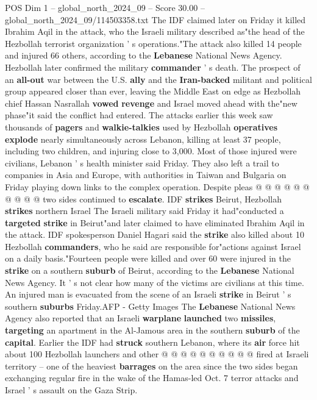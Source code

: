 \begin{textsample}{POS Dim 1 – global\_north\_2024\_09 – Score 30.00 – global\_north\_2024\_09/114503358.txt}  \label{ex:f1_pos_094}
The IDF claimed later on Friday it killed Ibrahim Aqil in the attack, who the Israeli military described as"the head of the Hezbollah terrorist organization ' s operations."The attack also killed 14 people and injured 66 others, according to the \textbf{Lebanese} National News Agency.
Hezbollah later confirmed the military \textbf{commander} ' s death.
The prospect of an \textbf{all-out} war between the U.S. \textbf{ally} and the \textbf{Iran-backed} militant and political group appeared closer than ever, leaving the Middle East on edge as Hezbollah chief Hassan Nasrallah \textbf{vowed} \textbf{revenge} and Israel moved ahead with the"new phase"it said the conflict had entered.
The attacks earlier this week saw thousands of \textbf{pagers} and \textbf{walkie-talkies} used by Hezbollah \textbf{operatives} \textbf{explode} nearly simultaneously across Lebanon, killing at least 37 people, including two children, and injuring close to 3,000.
Most of those injured were civilians, Lebanon ' s health minister said Friday.
They also left a trail to companies in Asia and Europe, with authorities in Taiwan and Bulgaria on Friday playing down links to the complex operation.
Despite pleas @ @ @ @ @ @ @ @ @ @ two sides continued to \textbf{escalate}.
IDF \textbf{strikes} Beirut, Hezbollah \textbf{strikes} northern Israel The Israeli military said Friday it had"conducted a \textbf{targeted} \textbf{strike} in Beirut"and later claimed to have eliminated Ibrahim Aqil in the attack.
IDF spokesperson Daniel Hagari said the \textbf{strike} also killed about 10 Hezbollah \textbf{commanders}, who he said are responsible for"actions against Israel on a daily basis."Fourteen people were killed and over 60 were injured in the \textbf{strike} on a southern \textbf{suburb} of Beirut, according to the \textbf{Lebanese} National News Agency.
It ' s not clear how many of the victims are civilians at this time.
An injured man is evacuated from the scene of an Israeli \textbf{strike} in Beirut ' s southern \textbf{suburbs} Friday.AFP - Getty Images The \textbf{Lebanese} National News Agency also reported that an Israeli \textbf{warplane} \textbf{launched} two \textbf{missiles}, \textbf{targeting} an apartment in the Al-Jamous area in the southern \textbf{suburb} of the \textbf{capital}.
Earlier the IDF had \textbf{struck} southern Lebanon, where its \textbf{air} force hit about 100 Hezbollah launchers and other @ @ @ @ @ @ @ @ @ @ fired at Israeli territory -- one of the heaviest \textbf{barrages} on the area since the two sides began exchanging regular fire in the wake of the Hamas-led Oct. 7 terror attacks and Israel ' s assault on the Gaza Strip.

\end{textsample}
